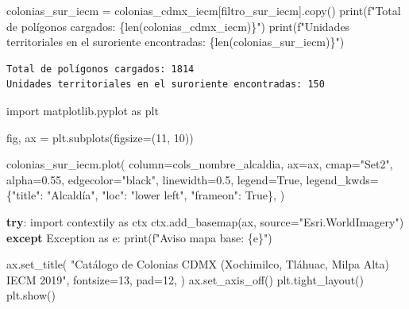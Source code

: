 \documentclass[
  spanish,
  letterpaper,
  DIV=11,
  numbers=noendperiod]{scrartcl}
\newenvironment{Shaded}{\begin{snugshade}}{\end{snugshade}}
\newcommand{\BuiltInTok}[1]{\textcolor[rgb]{0.00,0.23,0.31}{#1}}
\newcommand{\ControlFlowTok}[1]{\textcolor[rgb]{0.00,0.23,0.31}{\textbf{#1}}}
\newcommand{\DecValTok}[1]{\textcolor[rgb]{0.68,0.00,0.00}{#1}}
\newcommand{\FloatTok}[1]{\textcolor[rgb]{0.68,0.00,0.00}{#1}}
\newcommand{\ImportTok}[1]{\textcolor[rgb]{0.00,0.46,0.62}{#1}}
\newcommand{\NormalTok}[1]{\textcolor[rgb]{0.00,0.23,0.31}{#1}}
\newcommand{\OperatorTok}[1]{\textcolor[rgb]{0.37,0.37,0.37}{#1}}
\newcommand{\PreprocessorTok}[1]{\textcolor[rgb]{0.68,0.00,0.00}{#1}}
\newcommand{\SpecialCharTok}[1]{\textcolor[rgb]{0.37,0.37,0.37}{#1}}
\newcommand{\SpecialStringTok}[1]{\textcolor[rgb]{0.13,0.47,0.30}{#1}}
\newcommand{\StringTok}[1]{\textcolor[rgb]{0.13,0.47,0.30}{#1}}
\newcommand{\VariableTok}[1]{\textcolor[rgb]{0.07,0.07,0.07}{#1}}
\begin{document}
\begin{Shaded}
\begin{Highlighting}[]
\NormalTok{colonias\_sur\_iecm }\OperatorTok{=}\NormalTok{ colonias\_cdmx\_iecm[filtro\_sur\_iecm].copy()}
\BuiltInTok{print}\NormalTok{(}\SpecialStringTok{f"Total de polígonos cargados: }\SpecialCharTok{\{}\BuiltInTok{len}\NormalTok{(colonias\_cdmx\_iecm)}\SpecialCharTok{\}}\SpecialStringTok{"}\NormalTok{)}
\BuiltInTok{print}\NormalTok{(}\SpecialStringTok{f"Unidades territoriales en el suroriente encontradas: }\SpecialCharTok{\{}\BuiltInTok{len}\NormalTok{(colonias\_sur\_iecm)}\SpecialCharTok{\}}\SpecialStringTok{"}\NormalTok{)}
\end{Highlighting}
\end{Shaded}

\begin{verbatim}
Total de polígonos cargados: 1814
Unidades territoriales en el suroriente encontradas: 150
\end{verbatim}

\begin{Shaded}
\begin{Highlighting}[]
\ImportTok{import}\NormalTok{ matplotlib.pyplot }\ImportTok{as}\NormalTok{ plt}

\NormalTok{fig, ax }\OperatorTok{=}\NormalTok{ plt.subplots(figsize}\OperatorTok{=}\NormalTok{(}\DecValTok{11}\NormalTok{, }\DecValTok{10}\NormalTok{))}

\NormalTok{colonias\_sur\_iecm.plot(}
\NormalTok{    column}\OperatorTok{=}\NormalTok{cols\_nombre\_alcaldia,}
\NormalTok{    ax}\OperatorTok{=}\NormalTok{ax,}
\NormalTok{    cmap}\OperatorTok{=}\StringTok{"Set2"}\NormalTok{,}
\NormalTok{    alpha}\OperatorTok{=}\FloatTok{0.55}\NormalTok{,}
\NormalTok{    edgecolor}\OperatorTok{=}\StringTok{"black"}\NormalTok{,}
\NormalTok{    linewidth}\OperatorTok{=}\FloatTok{0.5}\NormalTok{,}
\NormalTok{    legend}\OperatorTok{=}\VariableTok{True}\NormalTok{,}
\NormalTok{    legend\_kwds}\OperatorTok{=}\NormalTok{\{}\StringTok{"title"}\NormalTok{: }\StringTok{"Alcaldía"}\NormalTok{, }\StringTok{"loc"}\NormalTok{: }\StringTok{"lower left"}\NormalTok{, }\StringTok{"frameon"}\NormalTok{: }\VariableTok{True}\NormalTok{\},}
\NormalTok{)}

\ControlFlowTok{try}\NormalTok{:}
    \ImportTok{import}\NormalTok{ contextily }\ImportTok{as}\NormalTok{ ctx}
\NormalTok{    ctx.add\_basemap(ax, source}\OperatorTok{=}\StringTok{"Esri.WorldImagery"}\NormalTok{)}
\ControlFlowTok{except} \PreprocessorTok{Exception} \ImportTok{as}\NormalTok{ e:}
    \BuiltInTok{print}\NormalTok{(}\SpecialStringTok{f"Aviso mapa base: }\SpecialCharTok{\{}\NormalTok{e}\SpecialCharTok{\}}\SpecialStringTok{"}\NormalTok{)}

\NormalTok{ax.set\_title(}
    \StringTok{"Catálogo de Colonias CDMX (Xochimilco, Tláhuac, Milpa Alta) IECM 2019"}\NormalTok{,}
\NormalTok{    fontsize}\OperatorTok{=}\DecValTok{13}\NormalTok{,}
\NormalTok{    pad}\OperatorTok{=}\DecValTok{12}\NormalTok{,}
\NormalTok{)}
\NormalTok{ax.set\_axis\_off()}
\NormalTok{plt.tight\_layout()}
\NormalTok{plt.show()}
\end{Highlighting}
\end{Shaded}
\end{document}
